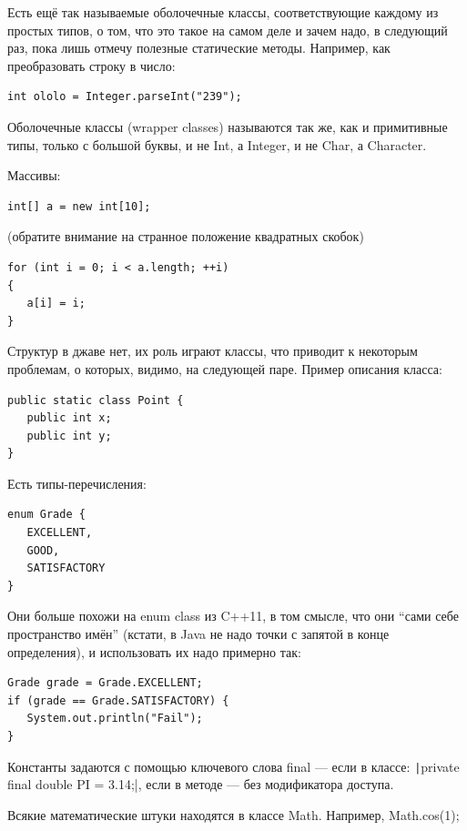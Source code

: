 \documentclass[a5paper]{article}
\begin{document}
Есть ещё так называемые оболочечные классы, соответствующие каждому из простых типов, о том, что это такое на самом деле и зачем надо, в следующий раз, пока лишь отмечу полезные статические методы. Например, как преобразовать строку в число:

\begin{verbatim}
int ololo = Integer.parseInt("239");
\end{verbatim}

Оболочечные классы (wrapper classes) называются так же, как и примитивные типы, только с большой буквы, и не Int, а Integer, и не Char, а Character.

Массивы: 

\begin{verbatim}
int[] a = new int[10]; 
\end{verbatim}

(обратите внимание на странное положение квадратных скобок)

\begin{verbatim}
for (int i = 0; i < a.length; ++i)
{
   a[i] = i;
}
\end{verbatim}

Структур в джаве нет, их роль играют классы, что приводит к некоторым проблемам, о которых, видимо, на следующей паре. Пример описания класса:

\begin{verbatim}
public static class Point {
   public int x;
   public int y;
}
\end{verbatim}

Есть типы-перечисления:

\begin{verbatim}
enum Grade {
   EXCELLENT,
   GOOD,
   SATISFACTORY
}
\end{verbatim}

Они больше похожи на enum class из C++11, в том смысле, что они ``сами себе пространство имён'' (кстати, в Java не надо точки с запятой в конце определения), и использовать их надо примерно так:

\begin{verbatim}
Grade grade = Grade.EXCELLENT;
if (grade == Grade.SATISFACTORY) {
   System.out.println("Fail");
}
\end{verbatim}

Константы задаются с помощью ключевого слова final --- если в классе: \texttt|private final double PI = 3.14;|, если в методе --- без модификатора доступа.

Всякие математические штуки находятся в классе Math. Например, Math.cos(1);
\end{document}
